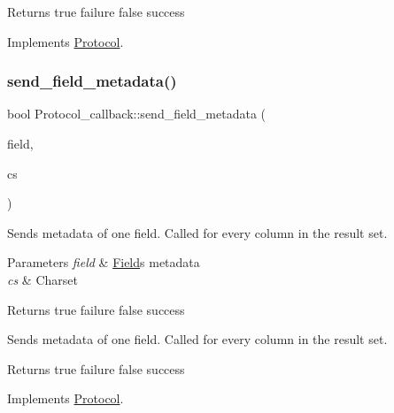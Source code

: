\begin{DoxyReturn}{Returns}
true failure false success 
\end{DoxyReturn}


Implements \mbox{\hyperlink{classProtocol_a7718f78528dde01063f4da3d074909e2}{Protocol}}.

\mbox{\label{classProtocol__callback_a490af13a555c3603ecd47d9666a0018e}} 
\subsubsection{\texorpdfstring{send\+\_\+field\+\_\+metadata()}{send\_field\_metadata()}}
{\footnotesize\ttfamily bool Protocol\+\_\+callback\+::send\+\_\+field\+\_\+metadata (\begin{DoxyParamCaption}\item[{\mbox{\hyperlink{classSend__field}{Send\+\_\+field}} $\ast$}]{field,  }\item[{const C\+H\+A\+R\+S\+E\+T\+\_\+\+I\+N\+FO $\ast$}]{cs }\end{DoxyParamCaption})\hspace{0.3cm}{\ttfamily [virtual]}}

Sends metadata of one field. Called for every column in the result set.


\begin{DoxyParams}{Parameters}
{\em field} & \mbox{\hyperlink{classField}{Field}}\textquotesingle{}s metadata \\
\hline
{\em cs} & Charset\\
\hline
\end{DoxyParams}
\begin{DoxyReturn}{Returns}
true failure false success
\end{DoxyReturn}
Sends metadata of one field. Called for every column in the result set.

\begin{DoxyReturn}{Returns}
true failure false success 
\end{DoxyReturn}


Implements \mbox{\hyperlink{classProtocol_ab1c4f70c198fa10fbf4aed0dfc2c4847}{Protocol}}.

\mbox{\label{classProtocol__callback_ab66d2b345a29403acd422e76c95903ed}} 
